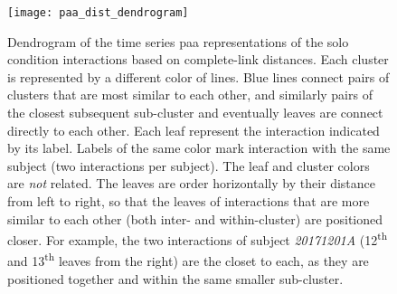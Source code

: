 \begin{landscape}
	\begin{figure}[t]
		\centering
		\hspace*{-4cm}
		\texttt{[image: paa\_dist\_dendrogram]}
		\caption[Dendrogram of time series representation of interactions distances]
			{Dendrogram of the time series \ac{paa} representations of the solo condition interactions based on complete-link distances.
			 Each cluster is represented by a different color of lines.
			 Blue lines connect pairs of clusters that are most similar to each other, and similarly pairs of the closest subsequent sub-cluster and eventually leaves are connect directly to each other.
			 Each leaf represent the interaction indicated by its label.
			 Labels of the same color mark interaction with the same subject (two interactions per subject).
			 The leaf and cluster colors are \emph{not} related.
			 The leaves are order horizontally by their distance from left to right, so that the leaves of interactions that are more similar to each other (both inter- and within-cluster) are positioned closer.
			 For example, the two interactions of subject \emph{20171201A} (12\textsuperscript{th} and 13\textsuperscript{th} leaves from the right) are the closet to each, as they are positioned together and within the same smaller sub-cluster.}
		\label{fig:paa_dist_dendrogram}
	\end{figure}
\end{landscape}

